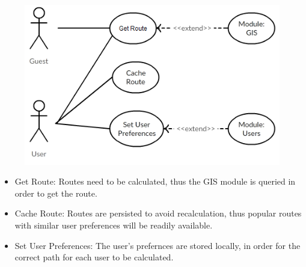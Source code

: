 \documentclass[12pt]{article}
\begin{document}
\begin{figure}[h]
\centering
\includegraphics[scale=0.5]{diagrams/navUse.png}
\end{figure}
\begin{itemize}
\item Get Route: Routes need to be calculated, thus the GIS module is queried in order to get the route.

\item Cache Route: Routes are persisted to avoid recalculation, thus popular routes with similar user preferences will be readily available.

\item Set User Preferences: The user's prefernces are stored locally, in order for the correct path for each user to be calculated.
\end{itemize}
 
\end{document}
